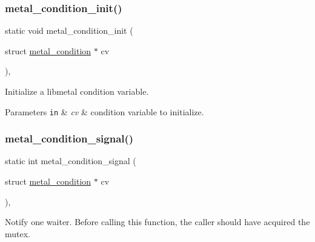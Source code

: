 \subsubsection{\texorpdfstring{metal\+\_\+condition\+\_\+init()}{metal\_condition\_init()}}
{\footnotesize\ttfamily static void metal\+\_\+condition\+\_\+init (\begin{DoxyParamCaption}\item[{struct \hyperlink{structmetal__condition}{metal\+\_\+condition} $\ast$}]{cv }\end{DoxyParamCaption})\hspace{0.3cm}{\ttfamily [inline]}, {\ttfamily [static]}}



Initialize a libmetal condition variable. 


\begin{DoxyParams}[1]{Parameters}
\mbox{\tt in}  & {\em cv} & condition variable to initialize. \\
\hline
\end{DoxyParams}
\mbox{\label{group__condition_ga042f4c19e3ddb3136365f4426e8bc439}} 
\subsubsection{\texorpdfstring{metal\+\_\+condition\+\_\+signal()}{metal\_condition\_signal()}}
{\footnotesize\ttfamily static int metal\+\_\+condition\+\_\+signal (\begin{DoxyParamCaption}\item[{struct \hyperlink{structmetal__condition}{metal\+\_\+condition} $\ast$}]{cv }\end{DoxyParamCaption})\hspace{0.3cm}{\ttfamily [inline]}, {\ttfamily [static]}}



Notify one waiter. Before calling this function, the caller should have acquired the mutex. 


